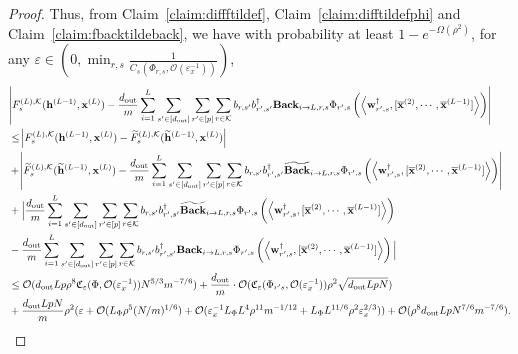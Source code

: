 \begin{proof}
	Thus, from Claim~\ref{claim:diffftildef}, Claim~\ref{claim:difftildefphi} and Claim~\ref{claim:fbacktildeback}, we have with probability at least $1-e^{-\Omega(\rho^2)}$, for any $\varepsilon \in (0, \min_{r, s} \frac{1}{C_s(\Phi_{r, s}, \mathcal{O}(\varepsilon_x^{-1}) ) })$,
\begingroup \allowdisplaybreaks
\begin{align*}      
	&\abs{F^{(L), \mathcal{K}}_s(\mathbf{h}^{(L-1)}, \mathbf{x}^{(L)}) - \frac{d_{\mathrm{out}} }{m} \sum_{i=1}^{L}  \sum_{s' \in [d_{\mathrm{out}} ]} \sum_{r' \in [p]} \sum_{r \in \mathcal{K}}  b_{r, s'} b_{r', s'}^{\dagger} \mathbf{Back}_{i \to L, r, s} \Phi_{r', s} \left(\left\langle \mathbf{w}_{r', s}^{\dagger}, [\overline{\mathbf{x}}^{(2)}, \cdots, \overline{\mathbf{x}}^{(L-1)}]\right\rangle\right)} \\&\le 
	\abs{F^{(L), \mathcal{K}}_s(\mathbf{h}^{(L-1)}, \mathbf{x}^{(L)}) - \widetilde{F}^{(L), \mathcal{K}}_s(\widetilde{\mathbf{h}}^{(L-1)}, \mathbf{x}^{(L)})} \\& +\abs{\widetilde{F}^{(L), \mathcal{K}}_s(\widetilde{\mathbf{h}}^{(L-1)}, \mathbf{x}^{(L)}) - \frac{d_{\mathrm{out}} }{m} \sum_{i=1}^{L}  \sum_{s' \in [d_{\mathrm{out}} ]} \sum_{r' \in [p]} \sum_{r \in \mathcal{K}}  b_{r, s'} b_{r', s'}^{\dagger} \widetilde{\mathbf{Back}}_{i \to L, r, s} \Phi_{r', s} \left(\left\langle \mathbf{w}_{r', s}^{\dagger}, [\overline{\mathbf{x}}^{(2)}, \cdots, \overline{\mathbf{x}}^{(L-1)}]\right\rangle\right)} \\& + \Big| \frac{d_{\mathrm{out}} }{m} \sum_{i=1}^{L}  \sum_{s' \in [d_{\mathrm{out}} ]} \sum_{r' \in [p]} \sum_{r \in \mathcal{K}}  b_{r, s'} b_{r', s'}^{\dagger} \widetilde{\mathbf{Back}}_{i \to L, r, s} \Phi_{r', s} \left(\left\langle \mathbf{w}_{r', s}^{\dagger}, [\overline{\mathbf{x}}^{(2)}, \cdots, \overline{\mathbf{x}}^{(L-1)}]\right\rangle\right) \\& -  \frac{d_{\mathrm{out}} }{m} \sum_{i=1}^{L}  \sum_{s' \in [d_{\mathrm{out}} ]} \sum_{r' \in [p]} \sum_{r \in \mathcal{K}}  b_{r, s'} b_{r', s'}^{\dagger} \mathbf{Back}_{i \to L, r, s} \Phi_{r', s} \left(\left\langle \mathbf{w}_{r', s}^{\dagger}, [\overline{\mathbf{x}}^{(2)}, \cdots, \overline{\mathbf{x}}^{(L-1)}]\right\rangle\right) \Big|
	\\&
	\le \mathcal{O}(d_{\mathrm{out}} Lp\rho^8  \mathfrak{C}_{\varepsilon}(\Phi, \mathcal{O}(\varepsilon_x^{-1})) N^{5/3} m^{-7/6}) + \frac{d_{\mathrm{out}} }{m} \cdot \mathcal{O}(\mathfrak{C}_{\varepsilon}(\Phi_{r' s}, \mathcal{O}(\varepsilon_x^{-1})) \rho^2 \sqrt{d_{\mathrm{out}} Lp N})  \\& + \frac{d_{\mathrm{out}} LpN}{m} \rho^2 (\varepsilon + \mathcal{O}( L_{\Phi}\rho^5 (N/m)^{1/6}) + \mathcal{O}(\varepsilon_x^{-1} L_{\Phi} L^4 \rho^{11} m^{-1/12} +  L_{\Phi} L^{11/6} \rho^2 \varepsilon_x^{2/3})) + \mathcal{O}(\rho^8d_{\mathrm{out}} Lp N^{7/6} m^{-7/6}) .
\end{align*}
\endgroup


\end{proof}
